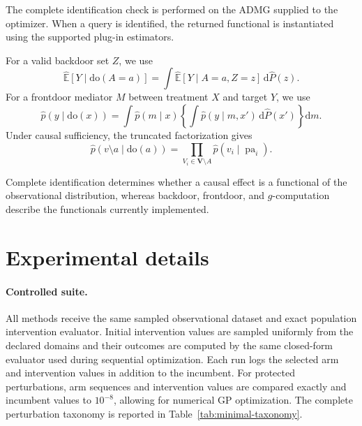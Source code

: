 \documentclass[twoside]{article}
\newcommand{\E}{\mathbb{E}}
\newcommand{\doo}{\mathrm{do}}
\begin{document}
The complete identification check is performed on the ADMG supplied to the optimizer. When a query is identified, the returned functional is instantiated using the supported plug-in estimators.

For a valid backdoor set $Z$, we use
\[
  \widehat{\E}[Y\mid\doo(A=a)]
  =
  \int
  \widehat{\E}[Y\mid A=a,Z=z]
  \,\mathrm d\widehat P(z).
\]
For a frontdoor mediator $M$ between treatment $X$ and target $Y$, we use
\[
  \widehat p(y\mid\doo(x))
  =
  \int \widehat p(m\mid x)
  \left\{
    \int \widehat p(y\mid m,x')
    \,\mathrm d\widehat P(x')
  \right\}
  \mathrm dm.
\]
Under causal sufficiency, the truncated factorization gives
\[
  \widehat p(v\setminus a\mid\doo(a))
  =
  \prod_{V_i\in\mathbf V\setminus A}
  \widehat p(v_i\mid\operatorname{pa}_i).
\]

Complete identification determines whether a causal effect is a functional of the observational distribution, whereas backdoor, frontdoor, and $g$-computation describe the functionals currently implemented.

\section{Experimental details}
\label{app:additional-results}

\paragraph{Controlled suite.} All methods receive the same sampled observational dataset and exact population intervention evaluator. Initial intervention values are sampled uniformly from the declared domains and their outcomes are computed by the same closed-form evaluator used during sequential optimization. Each run logs the selected arm and intervention values in addition to the incumbent. For protected perturbations, arm sequences and intervention values are compared exactly and incumbent values to $10^{-8}$, allowing for numerical GP optimization. The complete perturbation taxonomy is reported in Table~\ref{tab:minimal-taxonomy}.

\begin{table}[H]
  \centering
  \caption{Controlled misspecifications and measured paired trajectory
  deviations. Rows whose quotient is unchanged are predicted invariant by
  Proposition~\ref{prop:contract}.}
  \label{tab:minimal-taxonomy}
  \small
\end{table}
\end{document}
